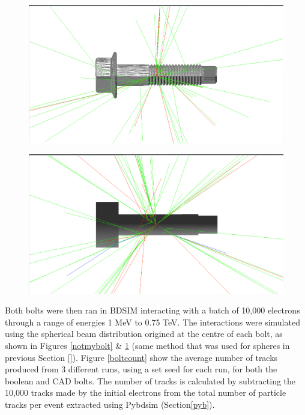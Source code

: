 \documentclass[12pt,a4paper]{article}
\begin{document}
\begin{figure}[h!]
\centering
\begin{minipage}{.5\textwidth}
  \centering
  \includegraphics[height=.5\linewidth]{Images//CAD_Screw//Screw_hnh_10MeVe.png}
  \label{notmybolt}
\end{minipage}%
\begin{minipage}{.5\textwidth}
  \centering
  \includegraphics[height=.5\linewidth]{Images//CAD_Screw//bensboltinbdsim.png}
  \label{mybolt}
\end{minipage}%
\end{figure}

\noindent Both bolts were then ran in BDSIM interacting with a batch of 10,000 electrons through a range of energies 1 MeV to 0.75 TeV. The interactions were simulated using the spherical beam distribution origined at the centre of each bolt, as shown in Figures \ref{notmybolt} \& \ref{mybolt} (same method that was used for spheres in previous Section \ref{}). Figure \ref{boltcount} show the average number of tracks produced from 3 different runs, using a set seed for each run, for both the boolean and CAD bolts. The number of tracks is calculated by subtracting the 10,000 tracks made by the initial electrons from the total number of particle tracks per event extracted using Pybdsim (Section\ref{pyb}).
\end{document}
